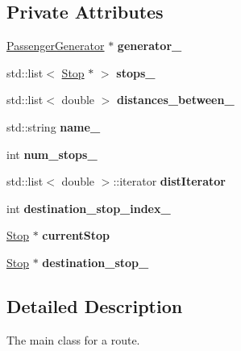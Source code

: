 \begin{figure}[H]
\begin{center}
\subsection*{Private Attributes}
\begin{DoxyCompactItemize}
\item 
\mbox{\label{classRoute_abb0d4a5df9055df459fb5f0b7ae2810e}} 
\hyperlink{classPassengerGenerator}{Passenger\+Generator} $\ast$ {\bfseries generator\+\_\+}
\item 
\mbox{\label{classRoute_a29357cad3848e8a3ff4dae57610968ee}} 
std\+::list$<$ \hyperlink{classStop}{Stop} $\ast$ $>$ {\bfseries stops\+\_\+}
\item 
\mbox{\label{classRoute_a307fe2f7f06105f4f3ae7172264fbcd7}} 
std\+::list$<$ double $>$ {\bfseries distances\+\_\+between\+\_\+}
\item 
\mbox{\label{classRoute_a89cf21e933b4599c2fa6dd21728539d9}} 
std\+::string {\bfseries name\+\_\+}
\item 
\mbox{\label{classRoute_ac54981fe7329c32eccbeaea86f7a62f1}} 
int {\bfseries num\+\_\+stops\+\_\+}
\item 
\mbox{\label{classRoute_aabece44a610bc4a061874026967ffe6a}} 
std\+::list$<$ double $>$\+::iterator {\bfseries dist\+Iterator}
\item 
\mbox{\label{classRoute_aac90998d2c10aa08885436874fb840f2}} 
int {\bfseries destination\+\_\+stop\+\_\+index\+\_\+}
\item 
\mbox{\label{classRoute_a5fea644d7493765558418a8f9fe29aa5}} 
\hyperlink{classStop}{Stop} $\ast$ {\bfseries current\+Stop}
\item 
\mbox{\label{classRoute_af702077267c252eae57caa0439b46f94}} 
\hyperlink{classStop}{Stop} $\ast$ {\bfseries destination\+\_\+stop\+\_\+}
\end{DoxyCompactItemize}


\subsection{Detailed Description}
The main class for a route. 


\end{center}
\end{figure}
